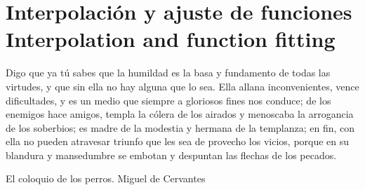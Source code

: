 \chapter{Interpolación y ajuste de funciones\\ Interpolation and function fitting}\label{interpolacion}
\epigraph{Digo que ya tú sabes que la humildad es la basa y fundamento de todas las virtudes, y que sin ella no hay alguna que lo sea. Ella allana inconvenientes, vence dificultades, y es un medio que siempre a gloriosos fines nos conduce; de los enemigos hace amigos, templa la cólera de los airados y menoscaba la arrogancia de los soberbios; es madre de la modestia y hermana de la templanza; en fin, con ella no pueden atravesar triunfo que les sea de provecho los vicios, porque en su blandura y mansedumbre se embotan y despuntan las flechas de los pecados.}{El coloquio de los perros. Miguel de Cervantes}

